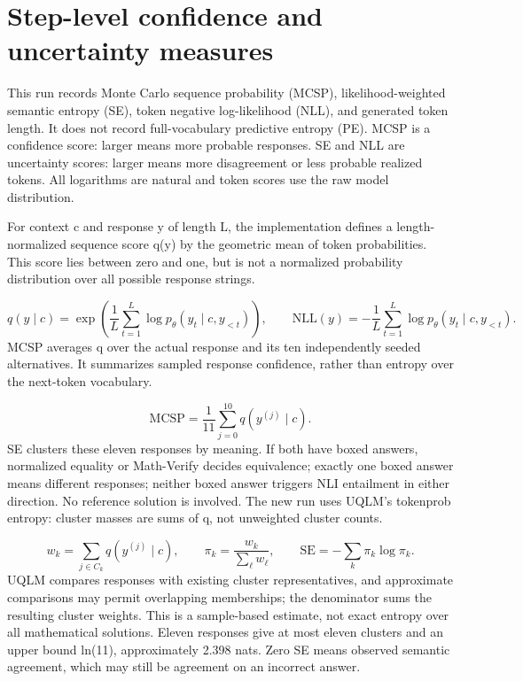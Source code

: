 \documentclass[11pt,a4paper]{article}
\begin{document}
\section{Step-level confidence and uncertainty measures}
This run records Monte Carlo sequence probability (MCSP), likelihood-weighted semantic entropy (SE), token negative log-likelihood (NLL), and generated token length. It does not record full-vocabulary predictive entropy (PE). MCSP is a confidence score: larger means more probable responses. SE and NLL are uncertainty scores: larger means more disagreement or less probable realized tokens. All logarithms are natural and token scores use the raw model distribution.

For context c and response y of length L, the implementation defines a length-normalized sequence score q(y) by the geometric mean of token probabilities. This score lies between zero and one, but is not a normalized probability distribution over all possible response strings.

\begin{equation*}
q(y\mid c)=\exp\!\left(\frac{1}{L}\sum_{t=1}^{L}\log p_\theta(y_t\mid c,y_{<t})\right),\qquad \mathrm{NLL}(y)=-\frac{1}{L}\sum_{t=1}^{L}\log p_\theta(y_t\mid c,y_{<t}).
\end{equation*}
MCSP averages q over the actual response and its ten independently seeded alternatives. It summarizes sampled response confidence, rather than entropy over the next-token vocabulary.

\begin{equation*}
\mathrm{MCSP}=\frac{1}{11}\sum_{j=0}^{10}q(y^{(j)}\mid c).
\end{equation*}
SE clusters these eleven responses by meaning. If both have boxed answers, normalized equality or Math-Verify decides equivalence; exactly one boxed answer means different responses; neither boxed answer triggers NLI entailment in either direction. No reference solution is involved. The new run uses UQLM's tokenprob entropy: cluster masses are sums of q, not unweighted cluster counts.

\begin{equation*}
w_k=\sum_{j\in C_k}q(y^{(j)}\mid c),\qquad \pi_k=\frac{w_k}{\sum_\ell w_\ell},\qquad \mathrm{SE}=-\sum_k\pi_k\log\pi_k.
\end{equation*}
UQLM compares responses with existing cluster representatives, and approximate comparisons may permit overlapping memberships; the denominator sums the resulting cluster weights. This is a sample-based estimate, not exact entropy over all mathematical solutions. Eleven responses give at most eleven clusters and an upper bound ln(11), approximately 2.398 nats. Zero SE means observed semantic agreement, which may still be agreement on an incorrect answer.
\end{document}
